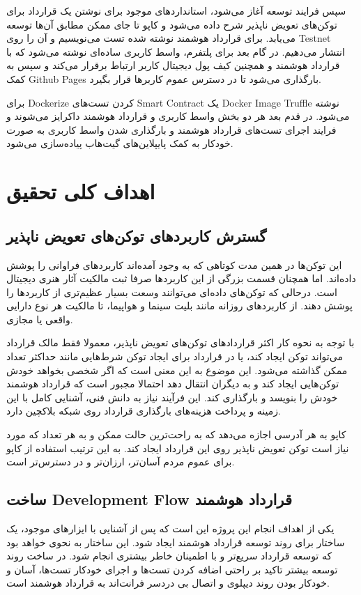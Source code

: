سپس فرایند توسعه آغاز می‌شود،
استاندارد‌های موجود برای نوشتن یک قرارداد برای توکن‌های تعویض ناپذیر شرح داده می‌شود و
کاپو تا جای ممکن مطابق آن‌ها توسعه می‌یابد.
برای قرارداد هوشمند نوشته شده تست می‌نویسیم و آن را روی
\gls{Testnet}
انتشار می‌دهیم.
در گام بعد برای پلتفرم،
واسط کاربری ساده‌ای نوشته می‌شود که با قرارداد هوشمند و
همچنین کیف پول دیجیتال کاربر ارتباط برقرار می‌کند و سپس به کمک
\gls{Github Pages}
بارگذاری می‌شود تا در دسترس عموم کاربرها قرار بگیرد.

برای
\gls{Dockerize}
کردن تست‌های
\gls{Smart Contract}
یک
\gls{Docker Image}
\gls{Truffle}
نوشته می‌شود.
در قدم بعد هر دو بخش واسط کاربری و قرارداد هوشمند داکرایز می‌شوند
و فرایند اجرای تست‌های قرارداد هوشمند
و بارگذاری شدن واسط کاربری به صورت خودکار به کمک پایپلاین‌های گیت‌هاب پیاده‌سازی می‌شود.


\section{اهداف کلی تحقیق}
\subsection{گسترش کاربرد‌های توکن‌های تعویض ناپذیر}
این توکن‌ها در همین مدت کوتاهی که به وجود آمده‌اند کاربردهای فراوانی را پوشش داده‌اند.
اما همچنان قسمت بزرگی از این کاربردها صرفا ثبت مالکیت آثار هنری دیجیتال است.
درحالی که توکن‌های داده‌ای می‌توانند وسعت بسیار عظیم‌تری از کاربردها را پوشش دهند.
از کاربردهای روزانه مانند بلیت سینما و هواپیما، تا مالکیت هر نوع دارایی واقعی یا مجازی.

با توجه به نحوه کار اکثر قراردادهای توکن‌های تعویض ناپذیر،
معمولا فقط مالک قرارداد می‌تواند توکن ایجاد کند،
یا در قرارداد برای ایجاد توکن شرط‌هایی مانند حداکثر تعداد ممکن گذاشته می‌شود.
این موضوع به این معنی است که اگر شخصی بخواهد خودش توکن‌هایی ایجاد کند
و به دیگران انتقال دهد احتمالا مجبور است که قرارداد هوشمند خودش را بنویسد و بارگذاری کند.
این فرآیند نیاز به دانش فنی، آشنایی کامل با این زمینه و پرداخت هزینه‌های بارگذاری قرارداد روی شبکه بلاکچین دارد.

کاپو به هر آدرسی اجازه می‌دهد که به راحت‌ترین حالت ممکن
و به هر تعداد که مورد نیاز است توکن تعویض ناپذیر روی این قرارداد ایجاد کند.
به این ترتیب استفاده از کاپو برای عموم مردم آسان‌تر، ارزان‌تر و در دسترس‌تر است.


\subsection{ساخت
\gls{Development Flow}
قرارداد هوشمند}
یکی از اهداف انجام این پروژه این است که پس از آشنایی با ایزارهای موجود،
یک ساختار برای روند توسعه قرارداد هوشمند ایجاد شود.
این ساختار به نحوی خواهد بود که توسعه قرارداد سریع‌تر و با اطمینان خاطر بیشتری انجام شود.
در ساخت روند توسعه بیشتر تاکید بر راحتی اضافه کردن تست‌ها و اجرای خودکار تست‌ها،
آسان و خودکار بودن روند دیپلوی و اتصال بی دردسر فرانت‌اند به قرارداد هوشمند است.

